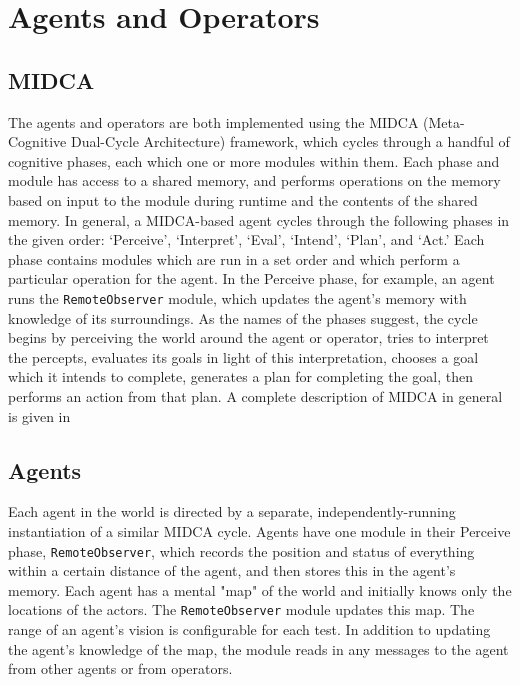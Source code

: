 \documentclass[letterpaper,11pt]{article}
\newcommand{\code}[1]{\texttt{#1}}
\begin{document}
	\section{Agents and Operators}
	\subsection{MIDCA}
	The agents and operators are both implemented using the MIDCA (Meta-Cognitive Dual-Cycle Architecture) framework, which cycles through a handful of cognitive phases, each which one or more modules within them. Each phase and module has access to a shared memory, and performs operations on the memory based on input to the module during runtime and the contents of the shared memory. In general, a MIDCA-based agent cycles through the following phases in the given order: `Perceive', `Interpret', `Eval', `Intend', `Plan', and `Act.' Each phase contains modules which are run in a set order and which perform a particular operation for the agent. In the Perceive phase, for example, an agent runs the \code{RemoteObserver} module, which updates the agent's memory with knowledge of its surroundings. As the names of the phases suggest, the cycle begins by perceiving the world around the agent or operator, tries to interpret the percepts, evaluates its goals in light of this interpretation, chooses a goal which it intends to complete, generates a plan for completing the goal, then performs an action from that plan. A complete description of MIDCA in general is given in \cite{cox2016midca}\par
	
	\subsection{Agents}
	Each agent in the world is directed by a separate, independently-running instantiation of a similar MIDCA cycle. Agents have one module in their Perceive phase, \code{RemoteObserver}, which records the position and status of everything within a certain distance of the agent, and then stores this in the agent's memory. Each agent has a mental "map" of the world and initially knows only the locations of the actors. The \code{RemoteObserver} module updates this map. The range of an agent's vision is configurable for each test. In addition to updating the agent's knowledge of the map, the module reads in any messages to the agent from other agents or from operators.\par
	
\end{document}
